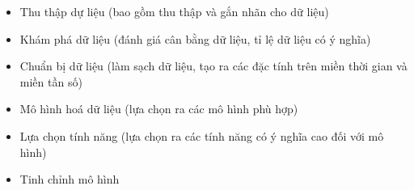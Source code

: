 \begin{itemize}
    \item Thu thập dự liệu (bao gồm thu thập và gắn nhãn cho dữ liệu)
    
    \item Khám phá dữ liệu (đánh giá cân bằng dữ liệu, tỉ lệ dữ liệu có ý nghĩa)
    
    \item Chuẩn bị dữ liệu (làm sạch dữ liệu, tạo ra các đặc tính trên miền thời gian và miền tần số)
    
    \item Mô hình hoá dữ liệu (lựa chọn ra các mô hình phù hợp)
    
    \item Lựa chọn tính năng (lựa chọn ra các tính năng có ý nghĩa cao đối với mô hình)

    \item Tinh chỉnh mô hình
\end{itemize}

